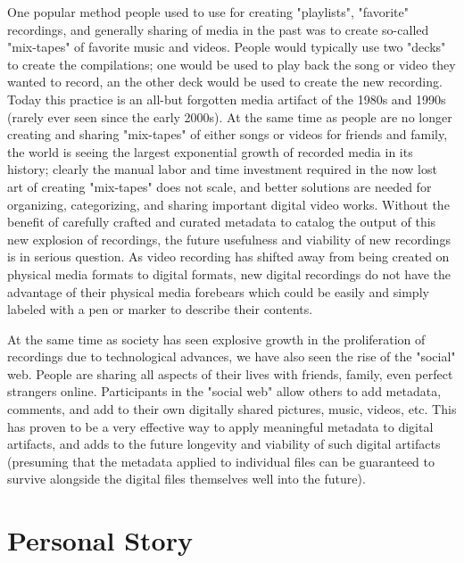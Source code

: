 One popular method people used to use for creating "playlists", "favorite" recordings, and generally sharing of media in the past was to create so-called "mix-tapes" of favorite music and videos.  People would typically use two "decks" to create the compilations; one would be used to play back the song or video they wanted to record, an the other deck would be used to create the new recording.  Today this practice is an all-but forgotten media artifact of the 1980s and 1990s (rarely ever seen since the early 2000s).  At the same time as people are no longer creating and sharing "mix-tapes" of either songs or videos for friends and family, the world is seeing the largest exponential growth of recorded media in its history; clearly the manual labor and time investment required in the now lost art of creating "mix-tapes" does not scale, and better solutions are needed for organizing, categorizing, and sharing important digital video works.  Without the benefit of carefully crafted and curated metadata to catalog the output of this new explosion of recordings, the future usefulness and viability of new recordings is in serious question.  As video recording has shifted away from being created on physical media formats to digital formats, new digital recordings do not have the advantage of their physical media forebears which could be easily and simply labeled with a pen or marker to describe their contents.

At the same time as society has seen explosive growth in the proliferation of recordings due to technological advances, we have also seen the rise of the "social" web.  People are sharing all aspects of their lives with friends, family, even perfect strangers online.  Participants in the "social web" allow others to add metadata, comments, and add to their own digitally shared pictures, music, videos, etc.  This has proven to be a very effective way to apply meaningful metadata to digital artifacts, and adds to the future longevity and viability of such digital artifacts (presuming that the metadata applied to individual files can be guaranteed to survive alongside the digital files themselves well into the future).




\section{Personal Story}
\label{sec:problem-statement:personal-story}

